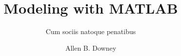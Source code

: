 




\usepackage{xcolor}

\usepackage{listings}

{}

\newcommand{\mcode}[1]{\lstinline{#1}}%

\usepackage{siunitx}

\usepackage{nshyper}
\renewcommand{\seename}{See}
\renewcommand{\alsoname}{See also}

\makeindex
\makeatletter
\def\idxdelim{\@ifnextchar{\hyperindexformat}{. }{, }}
\makeatother


\sloppy
\def\UrlFont{\em}

\frontmatter

\author{Allen B. Downey}

\title{Modeling with MATLAB}

\subtitle{Cum sociis natoque penatibus}


